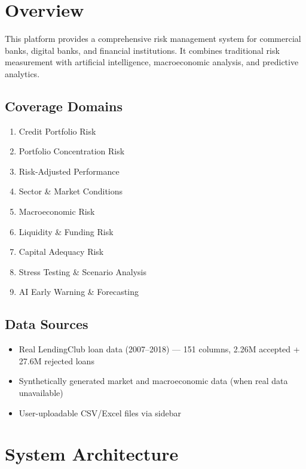 \documentclass[12pt,a4paper]{article}
\begin{document}
\newpage
\tableofcontents
\newpage

\section{Overview}

This platform provides a comprehensive risk management system for commercial banks, digital banks, and financial institutions. It combines traditional risk measurement with artificial intelligence, macroeconomic analysis, and predictive analytics.

\subsection{Coverage Domains}
\begin{enumerate}[itemsep=4pt]
    \item Credit Portfolio Risk
    \item Portfolio Concentration Risk
    \item Risk-Adjusted Performance
    \item Sector \& Market Conditions
    \item Macroeconomic Risk
    \item Liquidity \& Funding Risk
    \item Capital Adequacy Risk
    \item Stress Testing \& Scenario Analysis
    \item AI Early Warning \& Forecasting
\end{enumerate}

\subsection{Data Sources}
\begin{itemize}
    \item Real LendingClub loan data (2007--2018) --- 151 columns, 2.26M accepted + 27.6M rejected loans
    \item Synthetically generated market and macroeconomic data (when real data unavailable)
    \item User-uploadable CSV/Excel files via sidebar
\end{itemize}

\section{System Architecture}
\end{document}
